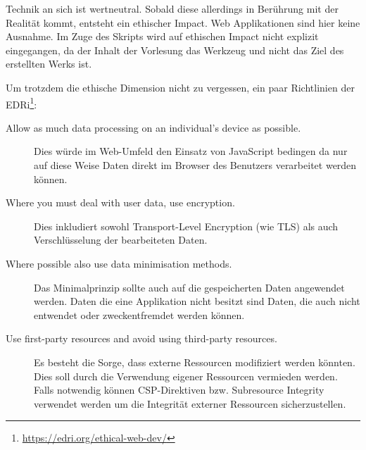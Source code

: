 Technik an sich ist wertneutral. Sobald diese allerdings in Berührung mit der Realität kommt, entsteht ein ethischer Impact. Web Applikationen sind hier keine Ausnahme. Im Zuge des Skripts wird auf ethischen Impact nicht explizit eingegangen, da der Inhalt der Vorlesung das Werkzeug und nicht das Ziel des erstellten Werks ist.

Um trotzdem die ethische Dimension nicht zu vergessen, ein paar Richtlinien der EDRi\footnote{\url{https://edri.org/ethical-web-dev/}}:

\begin{description}
	\item[Allow as much data processing on an individual’s device as possible.] Dies würde im Web-Umfeld den Einsatz von JavaScript bedingen da nur auf diese Weise Daten direkt im Browser des Benutzers verarbeitet werden können.
	\item[Where you must deal with user data, use encryption.] Dies inkludiert sowohl Transport-Level Encryption (wie TLS) als auch Verschlüsselung der bearbeiteten Daten.
	\item[Where possible also use data minimisation methods.] Das Minimalprinzip sollte auch auf die gespeicherten Daten angewendet werden. Daten die eine Applikation nicht besitzt sind Daten, die auch nicht entwendet oder zweckentfremdet werden können.
	\item[Use first-party resources and avoid using third-party resources.] Es besteht die Sorge, dass externe Ressourcen modifiziert werden könnten. Dies soll durch die Verwendung eigener Ressourcen vermieden werden. Falls notwendig können CSP-Direktiven bzw. Subresource Integrity verwendet werden um die Integrität externer Ressourcen sicherzustellen.
\end{description}
